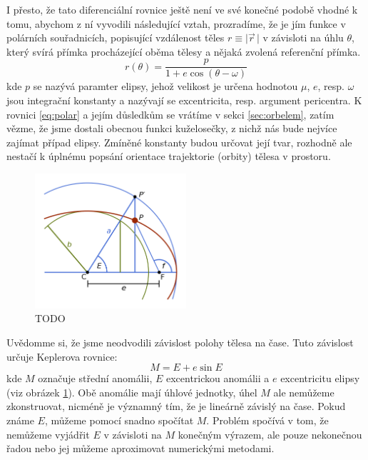 \documentclass[A4paper, 12pt, oneside]{book}
\newcommand{\abs}[1]{\lvert #1 \,\rvert}
\begin{document}
I přesto, že tato diferenciální rovnice ještě není ve své konečné podobě vhodné k tomu, abychom z ní vyvodili následující vztah, prozradíme, že je jím funkce v polárních souřadnicích, popisující vzdálenost těles $r\equiv\abs{\vec{r}}$ v závisloti na úhlu $\theta$, který svírá přímka procházející oběma tělesy a nějaká zvolená referenční přímka. 
\begin{equation} \label{eq:polar}
	r(\theta)=\frac{p}{1+e\cos{(\theta-\omega)}}
\end{equation}
kde $p$ se nazývá paramter elipsy, jehož velikost je určena hodnotou $\mu$, $e$, resp. $\omega$ jsou integrační konstanty a nazývají se excentricita, resp. argument pericentra. K rovnici \eqref{eq:polar} a jejím důsledkům se vrátíme v sekci \ref{sec:orbelem}, zatím vězme, že jsme dostali obecnou funkci kuželosečky, z nichž nás bude nejvíce zajímat případ elipsy. Zmíněné konstanty budou určovat její tvar, rozhodně ale nestačí k úplnému popsání orientace trajektorie (orbity) tělesa v prostoru. 

\begin{figure}
	\centering
	\includegraphics[width=0.5\textwidth]{obr/Eanomaly.png}
	\caption{TODO}
	\label{fig:E}
\end{figure}

Uvědomme si, že jsme neodvodili závislost polohy tělesa na čase. Tuto závislost určuje Keplerova rovnice:
\begin{equation} \label{eq:kepler}
M = E + e\sin E
\end{equation}
kde $M$ označuje střední anomálii, $E$ excentrickou anomálii a $e$ excentricitu elipsy (viz obrázek \ref{fig:E}). Obě anomálie mají úhlové jednotky, úhel $M$ ale nemůžeme zkonstruovat, nicméně je významný tím, že je lineárně závislý na čase. Pokud známe $E$, můžeme pomocí snadno spočítat $M$.  Problém spočívá v tom, že nemůžeme vyjádřit $E$ v závisloti na $M$ konečným výrazem, ale pouze nekonečnou řadou nebo jej můžeme aproximovat numerickými metodami.
\end{document}
